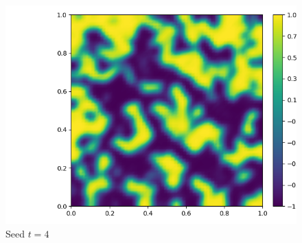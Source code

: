 \documentclass{article}
\begin{document}
\begin{figure}[H]
	\centering
	\includegraphics[width=\linewidth]{FEPics/Allen Cahn Test2_60x60_0.025_Seed BE_EndTime=50.png}
	\caption{Seed $t=4$}
\end{figure}
\end{document}
